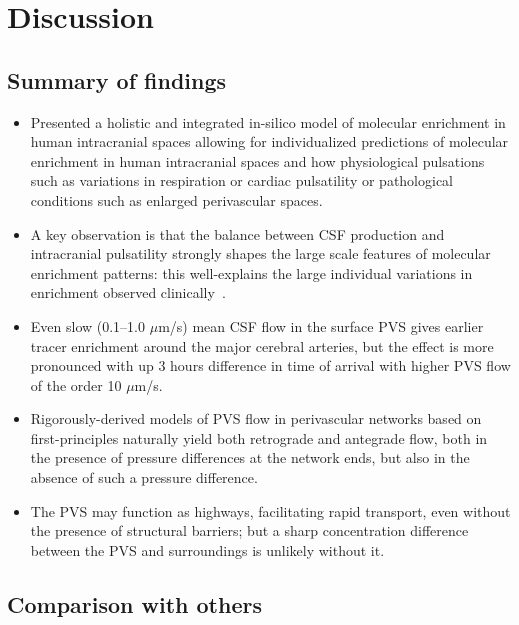 \documentclass[fleqn,10pt]{wlscirep}
\newcommand{\draft}[1]{\textcolor{gray}{#1}}
\begin{document}

\FloatBarrier

\section*{Discussion}


\subsection*{Summary of findings}

\begin{itemize}
\item
  Presented a holistic and integrated in-silico model of molecular
  enrichment in human intracranial spaces allowing for individualized
  predictions of molecular enrichment in human intracranial spaces and
  how physiological pulsations such as variations in respiration or
  cardiac pulsatility or pathological conditions such as enlarged
  perivascular spaces.
\item
  A key observation is that the balance between CSF production and
  intracranial pulsatility strongly shapes the large scale features of
  molecular enrichment patterns: this well-explains the large
  individual variations in enrichment observed
  clinically~\cite{ringstad2018brain}.
\item
  Even slow (0.1--1.0 $\mu$m/s) mean CSF flow in the surface PVS gives
  earlier tracer enrichment around the major cerebral arteries, but
  the effect is more pronounced with up 3 hours difference in time of
  arrival with higher PVS flow of the order 10 $\mu$m/s.
\item
  Rigorously-derived models of PVS flow in perivascular networks based
  on first-principles naturally yield both retrograde and antegrade
  flow, both in the presence of pressure differences at the network
  ends, but also in the absence of such a pressure difference. 
\item
  The PVS may function as highways, facilitating rapid transport, even
  without the presence of structural barriers; but a sharp
  concentration difference between the PVS and surroundings is
  unlikely without it.
\end{itemize}
\draft{\lipsum[1-2]}

\subsection*{Comparison with others}
\end{document}
